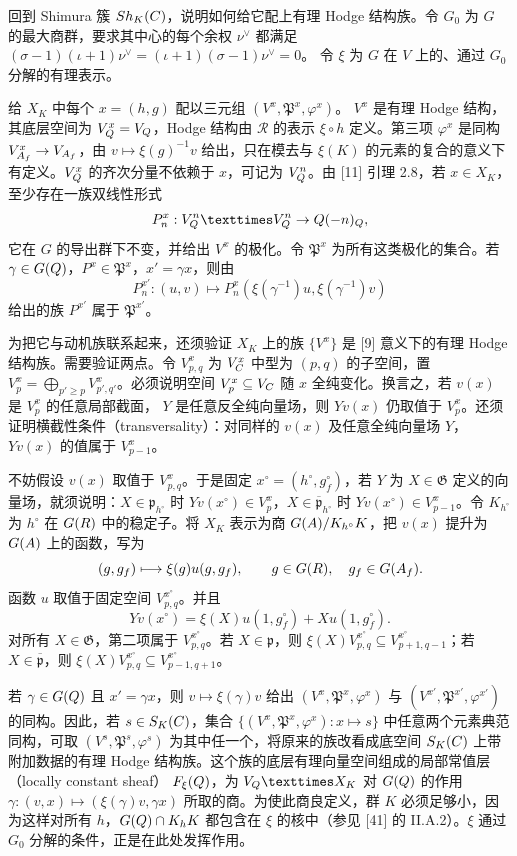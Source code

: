 回到 Shimura 簇 $Sh_K(C)$，说明如何给它配上有理 Hodge 结构族。令
$G_0$ 为 $G$ 的最大商群，要求其中心的每个余权 $\nu^\vee$ 都满足
$(\sigma-1)(\iota+1)\nu^\vee=(\iota+1)(\sigma-1)\nu^\vee=0$。
令 $\xi$ 为 $G$ 在 $V$ 上的、通过 $G_0$ 分解的有理表示。

给 $X_K$ 中每个 $x=(h,g)$ 配以三元组 $(V^x,\mathfrak P^x,\varphi^x)$。
$V^x$ 是有理 Hodge 结构，其底层空间为 $V_Q^x=V_Q$，Hodge 结构由
$\mathcal R$ 的表示 $\xi\circ h$ 定义。第三项 $\varphi^x$ 是同构
$V_{A_f}^x\to V_{A_f}$，由 $v\mapsto\xi(g)^{-1}v$ 给出，只在模去与
$\xi(K)$ 的元素的复合的意义下有定义。$V_Q^x$ 的齐次分量不依赖于 $x$，可记为
$V_Q^n$。由 [11] 引理 2.8，若 $x\in X_K$，至少存在一族双线性形式
\[
P_n^x:V_\Q^n\times V_\Q^n\to\Q(-n)_\Q,
\]
它在 $G$ 的导出群下不变，并给出 $V^x$ 的极化。令 $\mathfrak P^x$ 为所有这类极化的集合。若
$\gamma\in G(Q)$，$P^x\in\mathfrak P^x$，$x'=\gamma x$，则由
\[
P_n^{x'}:(u,v)\longmapsto P_n^x(\xi(\gamma^{-1})u,\xi(\gamma^{-1})v)
\]
给出的族 $P^{x'}$ 属于 $\mathfrak P^{x'}$。

为把它与动机族联系起来，还须验证 $X_K$ 上的族 $\{V^x\}$ 是 [9] 意义下的有理 Hodge 结构族。需要验证两点。令
$V_{p,q}^x$ 为 $V_C^x$ 中型为 $(p,q)$ 的子空间，置
$V_p^x=\bigoplus_{p'\ge p}V_{p',q'}^x$。必须说明空间
$V_p^x\subseteq V_C$ 随 $x$ 全纯变化。换言之，若 $v(x)$ 是 $V_p^x$ 的任意局部截面，
$Y$ 是任意反全纯向量场，则 $Yv(x)$ 仍取值于 $V_p^x$。还须证明横截性条件（transversality）：对同样的
$v(x)$ 及任意全纯向量场 $Y$，$Yv(x)$ 的值属于 $V_{p-1}^x$。

不妨假设 $v(x)$ 取值于 $V_{p,q}^x$。于是固定 $x^\circ=(h^\circ,g_f^\circ)$，若
$Y$ 为 $X\in\mathfrak G$ 定义的向量场，就须说明：$X\in\mathfrak p_{h^\circ}$ 时
$Yv(x^\circ)\in V_p^x$，$X\in\overline{\mathfrak p}_{h^\circ}$ 时
$Yv(x^\circ)\in V_{p-1}^x$。令 $K_{h^\circ}$ 为 $h^\circ$ 在 $G(R)$ 中的稳定子。将
$X_K$ 表示为商 $G(A)/K_{h^\circ}K$，把 $v(x)$ 提升为 $G(A)$ 上的函数，写为
\[
(g,g_f)\longmapsto\xi(g)u(g,g_f),\qquad g\in G(R),\quad g_f\in G(A_f).
\]
函数 $u$ 取值于固定空间 $V_{p,q}^{x^\circ}$。并且
\[
Yv(x^\circ)=\xi(X)u(1,g_f^\circ)+Xu(1,g_f^\circ).
\]
对所有 $X\in\mathfrak G$，第二项属于 $V_{p,q}^{x^\circ}$。若
$X\in\mathfrak p$，则 $\xi(X)V_{p,q}^{x^\circ}\subseteq V_{p+1,q-1}^{x^\circ}$；若
$X\in\overline{\mathfrak p}$，则
$\xi(X)V_{p,q}^{x^\circ}\subseteq V_{p-1,q+1}^{x^\circ}$。

若 $\gamma\in G(Q)$ 且 $x'=\gamma x$，则 $v\mapsto\xi(\gamma)v$ 给出
$(V^x,\mathfrak P^x,\varphi^x)$ 与 $(V^{x'},\mathfrak P^{x'},\varphi^{x'})$ 的同构。因此，若
$s\in S_K(C)$，集合 $\{(V^x,\mathfrak P^x,\varphi^x):x\mapsto s\}$ 中任意两个元素典范同构，可取
$(V^s,\mathfrak P^s,\varphi^s)$ 为其中任一个，将原来的族改看成底空间
$S_K(C)$ 上带附加数据的有理 Hodge 结构族。这个族的底层有理向量空间组成的局部常值层（locally constant sheaf）
$F_\xi(Q)$，为 $V_\Q\times X_K$ 对 $G(Q)$ 的作用
$\gamma:(v,x)\mapsto(\xi(\gamma)v,\gamma x)$ 所取的商。为使此商良定义，群
$K$ 必须足够小，因为这样对所有 $h$，$G(Q)\cap K_hK$ 都包含在 $\xi$ 的核中（参见
[41] 的 II.A.2）。$\xi$ 通过 $G_0$ 分解的条件，正是在此处发挥作用。

